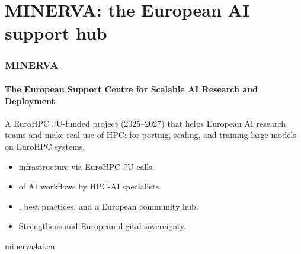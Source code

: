 \documentclass[10pt,aspectratio=169,notheorems]{beamer}
\begin{document}






\section{MINERVA: the European AI support hub}

\begin{frame}
    \frametitle{MINERVA}
    \framesubtitle{The European Support Centre for Scalable AI Research and Deployment}
    A EuroHPC JU-funded project (2025--2027) that helps European AI research
    teams and  make real use of HPC: 
    for porting, scaling, and training large models on EuroHPC systems.

    \vspace{0.8em}
    \begin{itemize}
        \item {} infrastructure via EuroHPC JU calls.
        \item {} of AI workflows by HPC-AI specialists.
        \item {}, best practices, and a European community hub.
        \item Strengthens  and European digital sovereignty.
    \end{itemize}

    \vspace{1em}
    \textcolor{SlidemintMuted}{minerva4ai.eu}
\end{frame}
\end{document}

